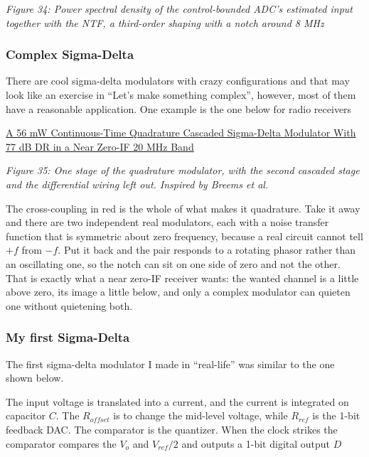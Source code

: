 {
\centering
{}
}

\emph{Figure 34: Power spectral density of the control-bounded ADC's
estimated input together with the NTF, a third-order shaping with a
notch around 8 MHz}

\subsubsection{Complex Sigma-Delta}\label{complex-sigma-delta}

There are cool sigma-delta modulators with crazy configurations and that
may look like an exercise in ``Let's make something complex'', however,
most of them have a reasonable application. One example is the one below
for radio receivers

\href{https://ieeexplore.ieee.org/stamp/stamp.jsp?tp=&arnumber=4381437}{A
56 mW Continuous-Time Quadrature Cascaded Sigma-Delta Modulator With 77
dB DR in a Near Zero-IF 20 MHz Band}


{
\centering
{}
}

\emph{Figure 35: One stage of the quadrature modulator, with the second
cascaded stage and the differential wiring left out. Inspired by Breems
et al. }

The cross-coupling in red is the whole of what makes it quadrature. Take
it away and there are two independent real modulators, each with a noise
transfer function that is symmetric about zero frequency, because a real
circuit cannot tell \(+f\) from \(-f\). Put it back and the pair
responds to a rotating phasor rather than an oscillating one, so the
notch can sit on one side of zero and not the other. That is exactly
what a near zero-IF receiver wants: the wanted channel is a little above
zero, its image a little below, and only a complex modulator can quieten
one without quietening both.

\subsubsection{My first Sigma-Delta}\label{my-first-sigma-delta}

The first sigma-delta modulator I made in ``real-life'' was similar to
the one shown below.

The input voltage is translated into a current, and the current is
integrated on capacitor \(C\). The \(R_{offset}\) is to change the
mid-level voltage, while \(R_{ref}\) is the 1-bit feedback DAC. The
comparator is the quantizer. When the clock strikes the comparator
compares the \(V_o\) and \(V_{ref}/2\) and outputs a 1-bit digital
output \(D\)


